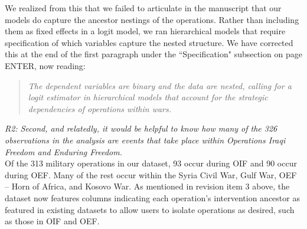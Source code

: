 \documentclass[fleqn,12pt]{article}
\begin{document}
We realized from this that we failed to articulate in the manuscript that our models do capture the ancestor nestings of the operations. Rather than including them as fixed effects in a logit model, we ran hierarchical models that require specification of which variables capture the nested structure. We have corrected this at the end of the first paragraph under the ``Specification" subsection on page ENTER, now reading:

\begin{quote}
    \textit{The dependent variables are binary and the data are nested, calling for a logit estimator in hierarchical models that account for the strategic dependencies of operations within wars.}
\end{quote}

\noindent
\textit{R2: Second, and relatedly, it would be helpful to know how many of the 326 observations in the analysis are events that take place within Operations Iraqi Freedom and Enduring Freedom.} \\

Of the 313 military operations in our dataset, 93 occur during OIF and 90 occur during OEF. Many of the rest occur within the Syria Civil War, Gulf War, OEF -- Horn of Africa, and Kosovo War. As mentioned in revision item 3 above, the dataset now features columns indicating each operation's intervention ancestor as featured in existing datasets to allow users to isolate operations as desired, such as those in OIF and OEF.

\clearpage
{}
\end{document}
